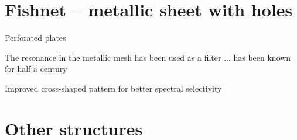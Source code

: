 \section{Fishnet -- metallic sheet with holes} \label{section_fishnet} %



Perforated plates \cite[p. 58]{brown1953artificial} %
\cite{yahiaoui2012metallo,rockstuhl2008light}

The resonance in the metallic mesh has been used as a filter 
\cite{ulrich1967effective,ulrich1967far}
... has been known for half a century \cite{vogel1964transmission}

Improved cross-shaped pattern for better spectral selectivity \cite{porterfield1994resonant}








\section{Other structures} %
\cite{croenne2009controle}

